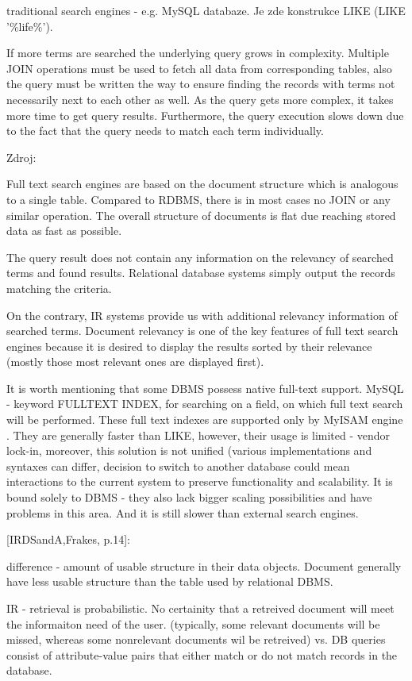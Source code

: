 traditional search engines - e.g. MySQL databaze. Je zde konstrukce
LIKE (LIKE '\%life\%').

If more terms are searched the underlying query grows in complexity.
Multiple JOIN operations must be used to fetch all data from corresponding
tables, also the query must be written the way to ensure finding the
records with terms not necessarily next to each other as well. As
the query gets more complex, it takes more time to get query results.
Furthermore, the query execution slows down due to the fact that the
query needs to match each term individually.

Zdroj: \cite{Solr3EnterpriseSS}

Full text search engines are based on the document structure which is analogous to a single table. Compared to RDBMS, there is in most cases no JOIN or any similar operation. The overall structure of documents is flat due reaching stored data as fast as possible.

The query result does not contain any information on the relevancy of searched terms and found results. 
Relational database systems simply output the records matching the criteria.

On the contrary, IR systems provide us with additional relevancy information of searched terms. 
Document relevancy is one of the key features of full text search engines because it is desired to display the results sorted by their relevance (mostly those most relevant ones are displayed first).

It is worth mentioning that some DBMS possess native full-text support.
MySQL - keyword FULLTEXT INDEX, for searching on a field, on which full text search will be performed. 
These full text indexes are supported only by MyISAM engine \cite{MyISAM}. 
They are generally faster than LIKE, however, their usage is limited - vendor lock-in,
moreover, this solution is not unified (various implementations and syntaxes can differ, decision to switch to another database could mean interactions to the current system to preserve functionality and scalability. 
It is bound solely to DBMS - they also lack bigger scaling possibilities and have problems in this area. 
And it is still slower than external search engines.

{[}IRDSandA,Frakes, p.14{]}:

difference - amount of usable structure in their data objects. Document
generally have less usable structure than the table used by relational
DBMS.

IR - retrieval is probabilistic. 
No certainity that a retreived document will meet the informaiton need of the user. 
(typically, some relevant documents will be missed, whereas some nonrelevant documents wil be
retreived) vs. DB queries consist of attribute-value pairs that either
match or do not match records in the database.

